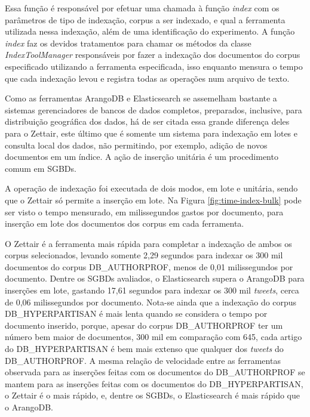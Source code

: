 
			Essa função é responsável por efetuar uma chamada à função \textit{index} com os parâmetros de tipo de indexação, corpus a ser indexado, e qual a ferramenta utilizada nessa indexação, além de uma identificação do experimento.
			A função \textit{index} faz os devidos tratamentos para chamar os métodos da classe \textit{IndexToolManager} responsáveis por fazer a indexação dos documentos do corpus especificado utilizando a ferramenta especificada, isso enquanto mensura o tempo que cada indexação levou e registra todas as operações num arquivo de texto.

			
			Como as ferramentas ArangoDB e Elasticsearch se assemelham bastante a sistemas gerenciadores de bancos de dados completos, preparados, inclusive, para distribuição geográfica dos dados, há de ser citada essa grande diferença deles para o Zettair, este último que é somente um sistema para indexação em lotes e consulta local dos dados, não permitindo, por exemplo, adição de novos documentos em um índice. 
			A ação de inserção unitária é um procedimento comum em SGBDs. 			

			A operação de indexação foi executada de dois modos, em lote e unitária, sendo que o Zettair só permite a inserção em lote. 
			Na Figura \ref{fig:time-index-bulk} pode ser visto o tempo mensurado, em milissegundos gastos por documento, para inserção em lote dos documentos dos corpus em cada ferramenta.

			

			O Zettair é a ferramenta mais rápida para completar a indexação de ambos os corpus selecionados, levando somente 2,29 segundos para indexar os 300 mil documentos do corpus DB\_AUTHORPROF, menos de 0,01 milissegundos por documento.
			Dentre os SGBDs avaliados, o Elasticsearch supera o ArangoDB para inserções em lote, gastando 17,61 segundos para indexar os 300 mil \textit{tweets}, cerca de 0,06 milissegundos por documento.
			Nota-se ainda que a indexação do corpus DB\_HYPERPARTISAN é mais lenta quando se considera o tempo por documento inserido, porque, apesar do corpus DB\_AUTHORPROF ter um número bem maior de documentos, 300 mil em comparação com 645, cada artigo do DB\_HYPERPARTISAN é bem mais extenso que qualquer dos \textit{tweets} do DB\_AUTHORPROF.
			A mesma relação de velocidade entre as ferramentas observada para as inserções feitas com os documentos do DB\_AUTHORPROF se mantem para as inserções feitas com os documentos do DB\_HYPERPARTISAN, o Zettair é o mais rápido, e, dentre os SGBDs, o Elasticsearch é mais rápido que o ArangoDB.
			
